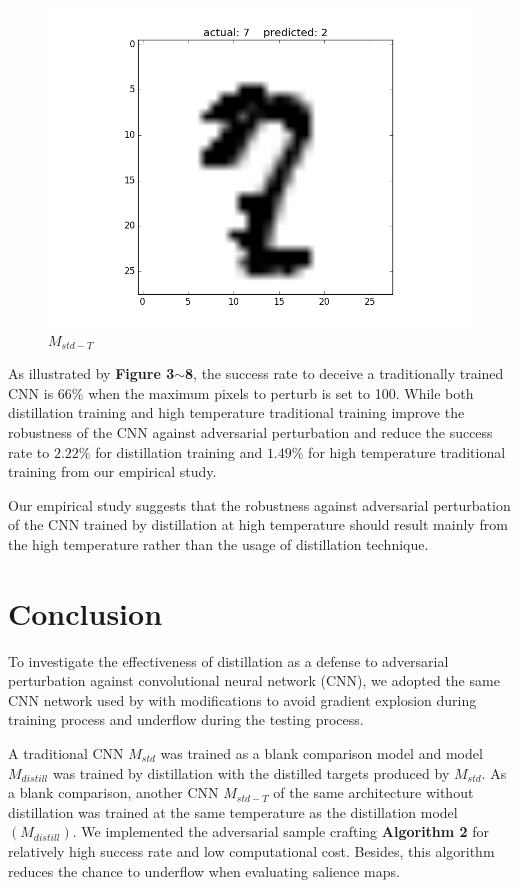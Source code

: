 \documentclass{article}
\begin{document}
\begin{figure}[h!]
\begin{minipage}{0.5\textwidth}
		\includegraphics[width=\textwidth]{T.png}
		\caption{$M_{std-T}$}
	\end{minipage} \hfill
\end{figure}

As illustrated by \textbf{Figure 3$\sim$8}, the success rate to deceive a traditionally trained CNN is $66\%$ when the maximum pixels to perturb is set to 100.
While both distillation training and high temperature traditional training improve the robustness of the CNN against adversarial perturbation and reduce the success rate to $2.22\%$ for distillation training and $1.49\%$ for high temperature traditional training from our empirical study.

Our empirical study suggests that the robustness against adversarial perturbation of the CNN trained by distillation at high temperature should result mainly from the high temperature rather than the usage of distillation technique.

\section{Conclusion}

To investigate the effectiveness of distillation as a defense to adversarial perturbation against convolutional neural network (CNN), we adopted the same CNN network used by \cite{Papernot} with modifications to avoid gradient explosion during training process and underflow during the testing process.

A traditional CNN $M_{std}$ was trained as a blank comparison model and model $M_{distill}$ was trained by distillation with the distilled targets produced by $M_{std}$.
As a blank comparison, another CNN $M_{std-T}$ of the same architecture without distillation was trained at the same temperature as the distillation model $(M_{distill})$.
We implemented the adversarial sample crafting \textbf{Algorithm 2} for relatively high success rate and low computational cost. Besides, this algorithm reduces the chance to underflow when evaluating salience maps.
\end{document}
